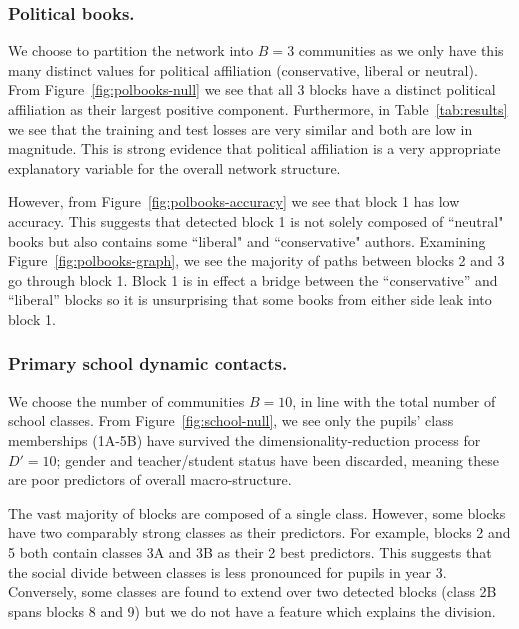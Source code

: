 \subsubsection{Political books.}

We choose to partition the network into $B=3$ communities as we only have this many distinct values for political affiliation (conservative, liberal or neutral).
From Figure~\ref{fig:polbooks-null} we see that all 3 blocks have a distinct political affiliation as their largest positive component.  
Furthermore, in Table~\ref{tab:results} we see that the training and test losses 
are very similar and both are low in magnitude. This is strong evidence 
that political affiliation is a very appropriate explanatory 
variable for the overall network structure.

However, from Figure~\ref{fig:polbooks-accuracy} we see that block 1 has low accuracy. 
This suggests that detected block 1 is not solely composed of ``neutral" books but also 
contains some ``liberal" and ``conservative" authors. Examining 
Figure~\ref{fig:polbooks-graph}, we see the majority of paths between blocks 2 and 3 go through block 1.
Block 1 is in effect a bridge between the ``conservative'' and ``liberal'' blocks so it is unsurprising that some books from either side leak into block 1.

\subsubsection{Primary school dynamic contacts.}

We choose the number of communities $B=10$, in line with the total number of 
school classes. From Figure~\ref{fig:school-null}, we see only the pupils' class memberships (1A-5B) have survived
the dimensionality-reduction process for $D'=10$;
gender and teacher/student status have been discarded,
meaning these are poor predictors of overall macro-structure.

The vast majority of blocks are composed of a single class. 
However, some blocks have two comparably strong classes as their predictors. 
For example, blocks 2 and 5 both contain classes 3A and 3B as their 2 best predictors. 
This suggests that the social divide between classes is less pronounced 
for pupils in year 3. Conversely, some classes are found to extend over two 
detected blocks (class 2B spans blocks 8 and 9) but we do 
not have a feature which explains the division.

